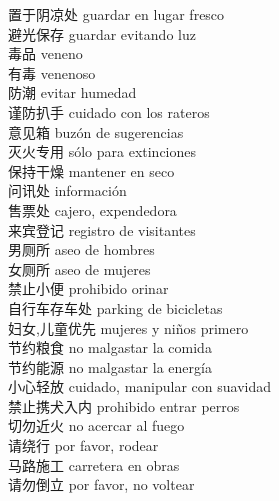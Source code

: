 \documentclass[13pt]{article}
\begin{document}
\begin{CJK*}{UTF8}{gkai}
\begin{multicols}{2}
\begin{pinyinscope}
置于阴凉处 \quad guardar en lugar fresco\\
避光保存 \quad guardar evitando luz\\
毒品 \quad veneno\\
有毒 \quad venenoso\\
防潮 \quad evitar humedad\\
谨防扒手 \quad cuidado con los rateros\\
意见箱 \quad buzón de sugerencias\\
灭火专用 \quad sólo para extinciones\\
保持干燥 \quad mantener en seco\\
问讯处 \quad información\\
售票处 \quad cajero, expendedora\\
来宾登记 \quad registro de visitantes\\
男厕所 \quad aseo de hombres\\
女厕所 \quad aseo de mujeres\\
禁止小便 \quad prohibido orinar\\
自行车存车处 \quad parking de bicicletas\\
妇女,儿童优先 \quad mujeres y niños primero\\
节约粮食 \quad no malgastar la comida\\
节约能源 \quad no malgastar la energía\\
小心轻放 \quad cuidado, manipular con suavidad\\
禁止携犬入内 \quad prohibido entrar perros\\
切勿近火 \quad no acercar al fuego\\
请绕行 \quad por favor, rodear\\
马路施工 \quad carretera en obras\\
请勿倒立 \quad por favor, no voltear\\

\end{pinyinscope}
\end{multicols}
\end{CJK*}
\end{document}
